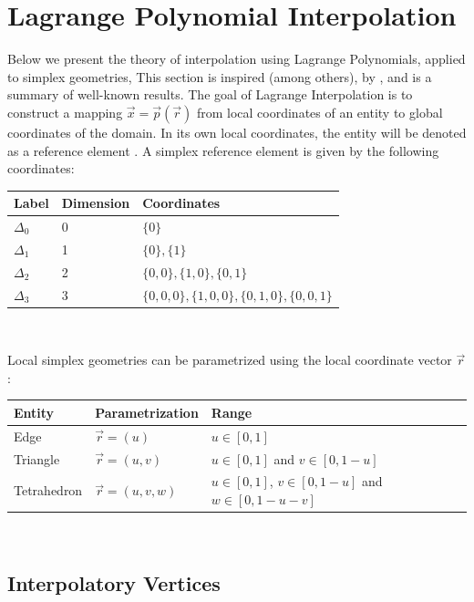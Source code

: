 \section{Lagrange Polynomial Interpolation}
\label{theory-lagrange}

Below we present the theory of interpolation using Lagrange Polynomials, applied to simplex geometries, This section is inspired (among others), by \cite{koshiba+2000, ilic+2003, berrut+2004}, and is a summary of well-known results. The goal of Lagrange Interpolation is to construct a mapping $\vec{x} = \vec{p}(\vec{r})$ from local coordinates of an entity to global coordinates of the domain. In its own local coordinates, the entity will be denoted as a reference element \citeDune{}. A simplex reference element is given by the following coordinates: \\

\noindent
\begin{tabular}{l l l}
\hline
  Label & Dimension & Coordinates \\ \hline
  $\Delta_0$ & 0 & $\{ 0 \}$ \\
  $\Delta_1$ & 1 & $\{ 0\}, \{ 1\}$ \\
  $\Delta_2$ & 2 & $\{ 0, 0 \}, \{ 1, 0 \}, \{ 0, 1 \}$ \\
  $\Delta_3$ & 3 & $\{ 0, 0, 0 \}, \{ 1, 0, 0 \}, \{ 0, 1, 0 \}, \{ 0, 0, 1 \}$ \\
\end{tabular} \\

\vspace{2mm}

\noindent
Local simplex geometries can be parametrized using the local coordinate vector $\vec{r}$: \\

\noindent
\begin{tabular}{l l l}
\hline
  Entity      & Parametrization    & Range \\ \hline
  Edge        & $\vec{r}=(u)$      & $u \in [0,1]$ \\
  Triangle    & $\vec{r}=(u,v)$    & $u \in [0,1]$ and $v \in [0, 1-u]$ \\
  Tetrahedron & $\vec{r}=(u,v,w)$  & $u \in [0,1]$, $v \in [0, 1-u]$ and $w \in [0, 1-u-v]$ \\
\end{tabular} \\

\subsection{Interpolatory Vertices}
\label{theory-lagrange-vertices}

